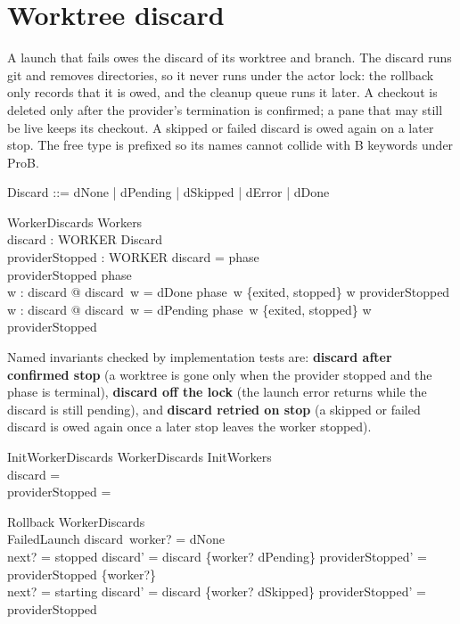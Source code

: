 \documentclass[a4paper,10pt,fleqn]{article}
\begin{document}
\section{Worktree discard}

A launch that fails owes the discard of its worktree and branch. The discard
runs git and removes directories, so it never runs under the actor lock: the
rollback only records that it is owed, and the cleanup queue runs it later.
A checkout is deleted only after the provider's termination is confirmed; a
pane that may still be live keeps its checkout. A skipped or failed discard
is owed again on a later stop. The free type is prefixed so its names cannot
collide with B keywords under ProB.

\begin{zed}
  Discard ::= dNone | dPending | dSkipped | dError | dDone
\end{zed}

\begin{schema}{WorkerDiscards}
  Workers \\
  discard : WORKER \pfun Discard \\
  providerStopped : \power WORKER
\where
  \dom discard = \dom phase \\
  providerStopped \subseteq \dom phase \\
  \forall w : \dom discard @ discard~w = dDone \implies
    phase~w \in \{exited, stopped\} \land w \in providerStopped \\
  \forall w : \dom discard @ discard~w = dPending \implies
    phase~w \in \{exited, stopped\} \land w \in providerStopped
\end{schema}

Named invariants checked by implementation tests are:
\textbf{discard after confirmed stop} (a worktree is gone only when the
provider stopped and the phase is terminal), \textbf{discard off the lock}
(the launch error returns while the discard is still pending), and
\textbf{discard retried on stop} (a skipped or failed discard is owed again
once a later stop leaves the worker stopped).

\begin{schema}{InitWorkerDiscards}
  WorkerDiscards
\where
  InitWorkers \\
  discard = \emptyset \\
  providerStopped = \emptyset
\end{schema}

\begin{schema}{Rollback}
  \Delta WorkerDiscards \\
  FailedLaunch
\where
  discard~worker? = dNone \\
  next? = stopped \implies
    discard' = discard \oplus \{worker? \mapsto dPending\} \land
    providerStopped' = providerStopped \cup \{worker?\} \\
  next? = starting \implies
    discard' = discard \oplus \{worker? \mapsto dSkipped\} \land
    providerStopped' = providerStopped
\end{schema}
\end{document}
